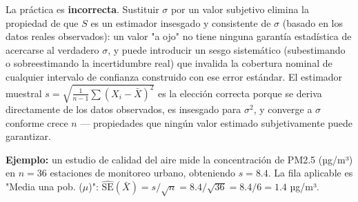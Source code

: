 \begin{solproblema}
	La práctica es \textbf{incorrecta}. Sustituir $\sigma$ por un valor subjetivo elimina la propiedad de que $S$ es un estimador insesgado y consistente de $\sigma$ (basado en los datos reales observados): un valor "a ojo" no tiene ninguna garantía estadística de acercarse al verdadero $\sigma$, y puede introducir un sesgo sistemático (subestimando o sobreestimando la incertidumbre real) que invalida la cobertura nominal de cualquier intervalo de confianza construido con ese error estándar. El estimador muestral $s = \sqrt{\frac{1}{n-1}\sum(X_i-\bar X)^2}$ es la elección correcta porque se deriva directamente de los datos observados, es insesgado para $\sigma^2$, y converge a $\sigma$ conforme crece $n$ — propiedades que ningún valor estimado subjetivamente puede garantizar.
\end{solproblema}

\begin{solproblema}
	\textbf{Ejemplo:} un estudio de calidad del aire mide la concentración de PM2.5 (µg/m³) en $n=36$ estaciones de monitoreo urbano, obteniendo $s=8.4$. La fila aplicable es "Media una pob. ($\mu$)": $\widehat{\text{SE}}(\bar X) = s/\sqrt n = 8.4/\sqrt{36} = 8.4/6 = 1.4$ µg/m³.
\end{solproblema}
